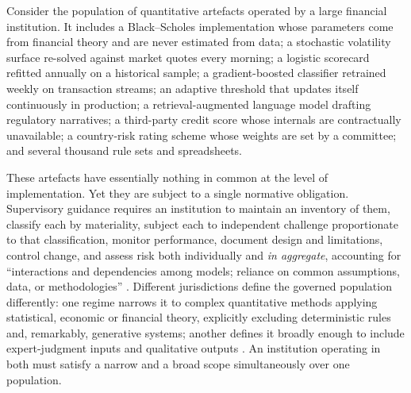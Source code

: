 \documentclass[11pt,a4paper]{article}
\renewcommand{\_}{\oldunderscore\allowbreak}
\theoremstyle{plain}
\theoremstyle{definition}
\theoremstyle{definition}
\theoremstyle{remark}
\begin{document}
Consider the population of quantitative artefacts operated by a large financial institution. It
includes a Black--Scholes implementation whose parameters come from financial theory and are never
estimated from data; a stochastic volatility surface re-solved against market quotes every morning; a
logistic scorecard refitted annually on a historical sample; a gradient-boosted classifier retrained
weekly on transaction streams; an adaptive threshold that updates itself continuously in production; a
retrieval-augmented language model drafting regulatory narratives; a third-party credit score whose
internals are contractually unavailable; a country-risk rating scheme whose weights are set by a
committee; and several thousand rule sets and spreadsheets.

These artefacts have essentially nothing in common at the level of implementation. Yet they are subject
to a single normative obligation. Supervisory guidance requires an institution to maintain an inventory
of them, classify each by materiality, subject each to independent challenge proportionate to that
classification, monitor performance, document design and limitations, control change, and assess risk
both individually and \emph{in aggregate}, accounting for ``interactions and dependencies among models;
reliance on common assumptions, data, or methodologies'' \cite{sr262,ss123}. Different jurisdictions
define the governed population differently: one regime narrows it to complex quantitative methods
applying statistical, economic or financial theory, explicitly excluding deterministic rules and,
remarkably, generative systems; another defines it broadly enough to include expert-judgment inputs and
qualitative outputs \cite{ss123,euaiact}. An institution operating in both must satisfy a narrow and a
broad scope simultaneously over one population.
\end{document}
